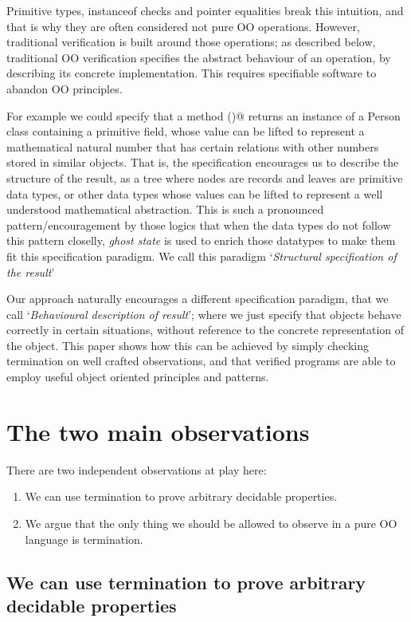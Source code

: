 \documentclass[runningheads]{llncs}
\begin{document}
Primitive types, instanceof checks and pointer equalities break this intuition, and that is why they are often considered not pure OO operations.
However, traditional verification is built around those operations; as described below,  traditional OO verification specifies the abstract behaviour of an operation, by describing its concrete implementation. This requires specifiable software to abandon OO principles.


For example we could specify that a method \Q@getOldestPerson()@ returns an instance of a Person class containing a primitive \Q@int@ field, whose value can be lifted to represent a mathematical natural number that has certain relations with other numbers stored in similar objects. That is, the specification encourages us to describe the structure of the result, as a tree where nodes are records and leaves are primitive data types, or other data types whose values can be lifted to represent a well understood mathematical abstraction.
This is such a pronounced pattern/encouragement by those logics that when the data types do not follow this pattern closelly, \emph{ghost state} is used to enrich those datatypes to make them fit this specification paradigm.
We call this paradigm `\emph{Structural specification of the result}'

Our approach naturally encourages a different specification paradigm, that we call 
`\emph{Behavioural description of result}'; where we just specify that objects behave correctly in certain situations, without reference to the concrete representation of the object.
This paper shows how this can be achieved by simply checking termination on well crafted observations, and that verified programs are able to employ useful object oriented principles and patterns.

\section{The two main observations}
There are two independent observations at play here:
\begin{enumerate}
\item We can use termination to prove arbitrary decidable properties.
\item We argue that the only thing we should be allowed to observe in a pure OO language is termination.
\end{enumerate}

\subsection{We can use termination to prove arbitrary decidable properties}
\end{document}
